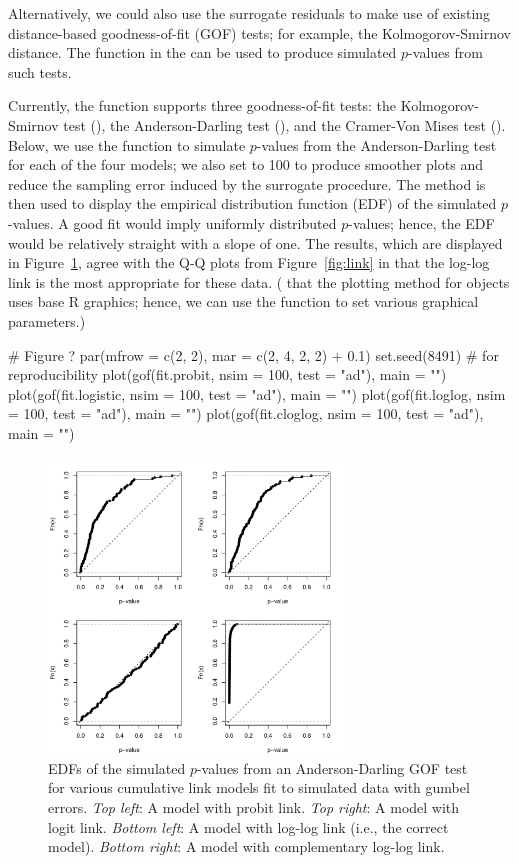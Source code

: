 Alternatively, we could also use the surrogate residuals to make use of existing distance-based goodness-of-fit (GOF) tests; for example, the Kolmogorov-Smirnov distance. The  function in the  can be used to produce simulated $p$-values from such tests. 

Currently, the  function supports three goodness-of-fit tests: the Kolmogorov-Smirnov test (), the Anderson-Darling test (), and the Cramer-Von Mises test (). Below, we use the  function to simulate $p$-values from the Anderson-Darling test for each of the four models; we also set  to 100 to produce smoother plots and reduce the sampling error induced by the surrogate procedure. The  method is then used to display the empirical distribution function (EDF) of the simulated $p$-values. A good fit would imply uniformly distributed $p$-values; hence, the EDF would be relatively straight with a slope of one. The results, which are displayed in Figure~\ref{fig:gof}, agree with the Q-Q plots from Figure~\ref{fig:link} in that the log-log link is the most appropriate for these data. ( that the plotting method for  objects uses base R graphics; hence, we can use the  function to set various graphical parameters.)
\begin{example}
# Figure ?
par(mfrow = c(2, 2), mar = c(2, 4, 2, 2) + 0.1) 
set.seed(8491)  # for reproducibility
plot(gof(fit.probit, nsim = 100, test = "ad"), main = "")
plot(gof(fit.logistic, nsim = 100, test = "ad"), main = "")
plot(gof(fit.loglog, nsim = 100, test = "ad"), main = "")
plot(gof(fit.cloglog, nsim = 100, test = "ad"), main = "")
\end{example}

\begin{figure}[!htbp]
  \centering
  \includegraphics[width=0.7\textwidth]{gof}
  \caption{EDFs of the simulated $p$-values from an Anderson-Darling GOF test for various cumulative link models fit to simulated data with gumbel errors. \textit{Top left}: A model with probit link. \textit{Top right}: A model with logit link. \textit{Bottom left}: A model with log-log link (i.e., the correct model). \textit{Bottom right}: A model with complementary log-log link.}  
  \label{fig:gof}
\end{figure}


